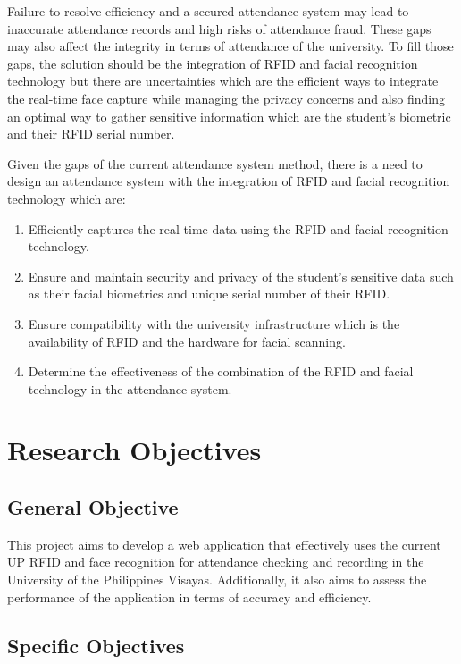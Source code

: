 Failure to resolve efficiency and a secured attendance system may lead to inaccurate attendance records and high risks of attendance fraud. These gaps may also affect the integrity in terms of attendance of the university. To fill those gaps, the solution should be the integration of RFID and facial recognition technology but there are uncertainties which are the efficient ways to integrate the real-time face capture while  managing the privacy concerns and also finding an optimal way to gather sensitive information which are the student’s biometric and their RFID serial number. 

Given the gaps of the current attendance system method, there is a need to design an attendance system with the integration of RFID and facial recognition technology which are:

\begin{enumerate}
	\item Efficiently captures the real-time data using the RFID and facial recognition technology.
	\item  Ensure and maintain security and privacy of the student’s sensitive data such as their facial biometrics and unique serial number of their RFID.  
	\item Ensure compatibility with the university infrastructure which is the availability of RFID and the hardware for facial scanning. 
	\item 	Determine the effectiveness of the combination of the RFID and facial technology in the attendance system. 
\end{enumerate}


\section{Research Objectives}
\label{sec:researchobjectives}

\subsection{General Objective}
\label{sec:generalobjective}

This project aims to develop a web application that effectively uses the current UP RFID and face recognition for attendance checking and recording in the University of the Philippines Visayas. Additionally, it also aims to assess the performance of the application in terms of accuracy and efficiency.


\subsection{Specific Objectives}
\label{sec:specificobjectives}


